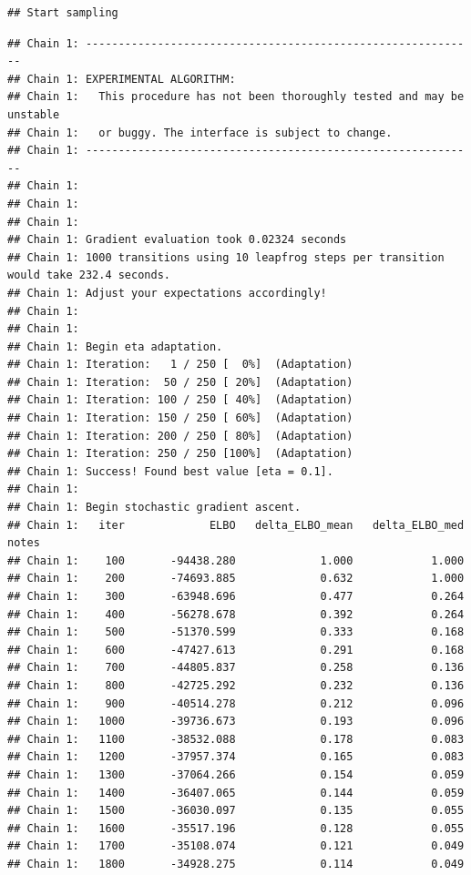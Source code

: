 \documentclass[
]{article}
\begin{document}
\begin{verbatim}
## Start sampling
\end{verbatim}

\begin{verbatim}
## Chain 1: ------------------------------------------------------------
## Chain 1: EXPERIMENTAL ALGORITHM:
## Chain 1:   This procedure has not been thoroughly tested and may be unstable
## Chain 1:   or buggy. The interface is subject to change.
## Chain 1: ------------------------------------------------------------
## Chain 1: 
## Chain 1: 
## Chain 1: 
## Chain 1: Gradient evaluation took 0.02324 seconds
## Chain 1: 1000 transitions using 10 leapfrog steps per transition would take 232.4 seconds.
## Chain 1: Adjust your expectations accordingly!
## Chain 1: 
## Chain 1: 
## Chain 1: Begin eta adaptation.
## Chain 1: Iteration:   1 / 250 [  0%]  (Adaptation)
## Chain 1: Iteration:  50 / 250 [ 20%]  (Adaptation)
## Chain 1: Iteration: 100 / 250 [ 40%]  (Adaptation)
## Chain 1: Iteration: 150 / 250 [ 60%]  (Adaptation)
## Chain 1: Iteration: 200 / 250 [ 80%]  (Adaptation)
## Chain 1: Iteration: 250 / 250 [100%]  (Adaptation)
## Chain 1: Success! Found best value [eta = 0.1].
## Chain 1: 
## Chain 1: Begin stochastic gradient ascent.
## Chain 1:   iter             ELBO   delta_ELBO_mean   delta_ELBO_med   notes 
## Chain 1:    100       -94438.280             1.000            1.000
## Chain 1:    200       -74693.885             0.632            1.000
## Chain 1:    300       -63948.696             0.477            0.264
## Chain 1:    400       -56278.678             0.392            0.264
## Chain 1:    500       -51370.599             0.333            0.168
## Chain 1:    600       -47427.613             0.291            0.168
## Chain 1:    700       -44805.837             0.258            0.136
## Chain 1:    800       -42725.292             0.232            0.136
## Chain 1:    900       -40514.278             0.212            0.096
## Chain 1:   1000       -39736.673             0.193            0.096
## Chain 1:   1100       -38532.088             0.178            0.083
## Chain 1:   1200       -37957.374             0.165            0.083
## Chain 1:   1300       -37064.266             0.154            0.059
## Chain 1:   1400       -36407.065             0.144            0.059
## Chain 1:   1500       -36030.097             0.135            0.055
## Chain 1:   1600       -35517.196             0.128            0.055
## Chain 1:   1700       -35108.074             0.121            0.049
## Chain 1:   1800       -34928.275             0.114            0.049

\end{verbatim}
\end{document}

